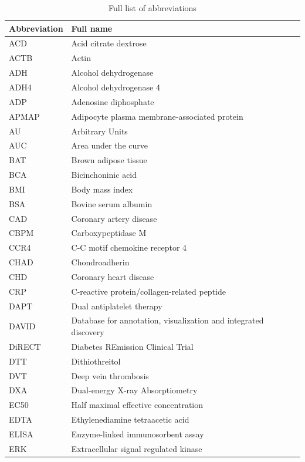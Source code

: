 \documentclass[11pt,twoside]{bristolthesis}
\begin{document}
  \listoffigures
  \begin{abbreviations}
    \begin{longtable}[t]{ll}
    \caption{Full list of abbreviations}\\
    \toprule
    Abbreviation & Full name\\
    \midrule
    ACD & Acid citrate dextrose\\
    ACTB & Actin\\
    ADH & Alcohol dehydrogenase\\
    ADH4 & Alcohol dehydrogenase 4\\
    ADP & Adenosine diphosphate\\
    \addlinespace
    APMAP & Adipocyte plasma membrane-associated protein\\
    AU & Arbitrary Units\\
    AUC & Area under the curve\\
    BAT & Brown adipose tissue\\
    BCA & Bicinchoninic acid\\
    \addlinespace
    BMI & Body mass index\\
    BSA & Bovine serum albumin\\
    CAD & Coronary artery disease\\
    CBPM & Carboxypeptidase M\\
    CCR4 & C-C motif chemokine receptor 4\\
    \addlinespace
    CHAD & Chondroadherin\\
    CHD & Coronary heart disease\\
    CRP & C-reactive protein/collagen-related peptide\\
    DAPT & Dual antiplatelet therapy\\
    DAVID & Database for annotation, visualization and integrated discovery\\
    \addlinespace
    DiRECT & Diabetes REmission Clinical Trial\\
    DTT & Dithiothreitol\\
    DVT & Deep vein thrombosis\\
    DXA & Dual-energy X-ray Absorptiometry\\
    EC50 & Half maximal effective concentration\\
    \addlinespace
    EDTA & Ethylenediamine tetraacetic acid\\
    ELISA & Enzyme-linked immunosorbent assay\\
    ERK & Extracellular signal regulated kinase\\

\end{longtable}
\end{abbreviations}
\end{document}
